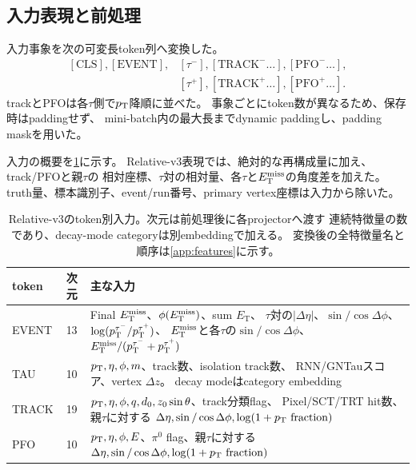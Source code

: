 \documentclass[xelatex,ja=standard,a4paper,10pt,twocolumn]{bxjsarticle}
\begin{document}
\subsection{入力表現と前処理}
\label{subsec:features}

入力事象を次の可変長token列へ変換した。
\begin{equation}
\begin{split}
  [\mathrm{CLS}], [\mathrm{EVENT}],&
  [\tau^-], [\mathrm{TRACK}^- \ldots], [\mathrm{PFO}^- \ldots],\\
  &[\tau^+], [\mathrm{TRACK}^+ \ldots], [\mathrm{PFO}^+ \ldots].
\end{split}
\label{eq:token_sequence}
\end{equation}
trackとPFOは各\(\tau\)側で\(p_{\mathrm{T}}\)降順に並べた。
事象ごとにtoken数が異なるため、保存時はpaddingせず、
mini-batch内の最大長までdynamic paddingし、padding maskを用いた。

入力の概要を\cref{tab:features}に示す。
Relative-v3表現では、絶対的な再構成量に加え、track/PFOと親\(\tau\)の
相対座標、\(\tau\)対の相対量、各\(\tau\)と\(E_{\mathrm{T}}^{\mathrm{miss}}\)の角度差を加えた。
truth量、標本識別子、event/run番号、primary vertex座標は入力から除いた。

\begin{table}[t]
  \centering
  \caption{Relative-v3のtoken別入力。次元は前処理後に各projectorへ渡す
    連続特徴量の数であり、decay-mode categoryは別embeddingで加える。
    変換後の全特徴量名と順序は\cref{app:features}に示す。}
  \label{tab:features}
  \small
  \begin{tabularx}{\textwidth}{@{}l c X@{}}
    \toprule
    token & 次元 & 主な入力 \\
    \midrule
    EVENT & 13 &
      Final \(E_{\mathrm{T}}^{\mathrm{miss}}\)、\(\phi(E_{\mathrm{T}}^{\mathrm{miss}})\)、sum \(E_{\mathrm{T}}\)、
      \(\tau\)対の\(|\Delta\eta|\)、\(\sin/\cos\Delta\phi\)、
      \(\log(p_{\mathrm{T}}^{\tau^-}/p_{\mathrm{T}}^{\tau^+})\)、
      \(E_{\mathrm{T}}^{\mathrm{miss}}\)と各\(\tau\)の\(\sin/\cos\Delta\phi\)、
      \(E_{\mathrm{T}}^{\mathrm{miss}}/(p_{\mathrm{T}}^{\tau^-}+p_{\mathrm{T}}^{\tau^+})\) \\
    TAU & 10 &
      \(p_{\mathrm{T}},\eta,\phi,m\)、track数、isolation track数、
      RNN/GNTauスコア、vertex \(\Delta z\)。
      decay modeはcategory embedding \\
    TRACK & 19 &
      \(p_{\mathrm{T}},\eta,\phi,q,d_0,z_0\sin\theta\)、track分類flag、
      Pixel/SCT/TRT hit数、親\(\tau\)に対する
      \(\Delta\eta,\sin/\cos\Delta\phi,\log(1+\pt\mathrm{\ fraction})\) \\
    PFO & 10 &
      \(p_{\mathrm{T}},\eta,\phi,E\)、\(\pi^0\) flag、親\(\tau\)に対する
      \(\Delta\eta,\sin/\cos\Delta\phi,\log(1+\pt\mathrm{\ fraction})\) \\
    \bottomrule
  \end{tabularx}
\end{table}
\end{document}
